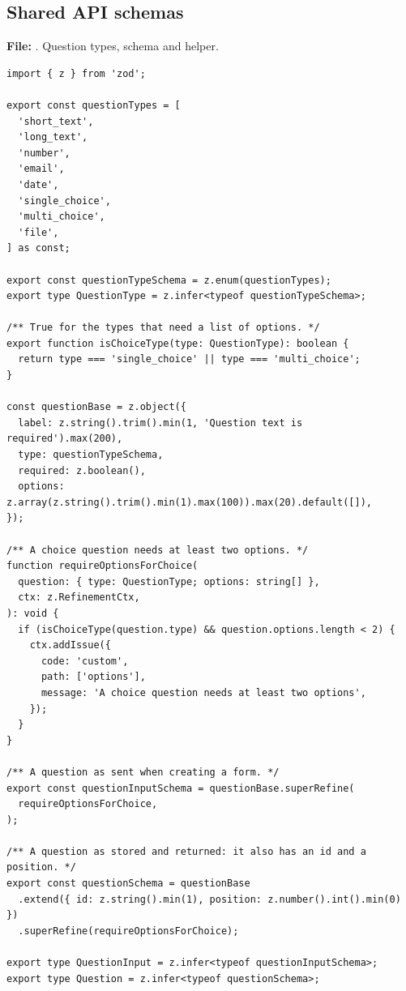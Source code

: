\documentclass[11pt,a4paper]{article}
\begin{document}
\subsection{Shared API schemas}
\textbf{File:} . Question types, schema and helper.\par
\begin{lstlisting}
import { z } from 'zod';

export const questionTypes = [
  'short_text',
  'long_text',
  'number',
  'email',
  'date',
  'single_choice',
  'multi_choice',
  'file',
] as const;

export const questionTypeSchema = z.enum(questionTypes);
export type QuestionType = z.infer<typeof questionTypeSchema>;

/** True for the types that need a list of options. */
export function isChoiceType(type: QuestionType): boolean {
  return type === 'single_choice' || type === 'multi_choice';
}

const questionBase = z.object({
  label: z.string().trim().min(1, 'Question text is required').max(200),
  type: questionTypeSchema,
  required: z.boolean(),
  options: z.array(z.string().trim().min(1).max(100)).max(20).default([]),
});

/** A choice question needs at least two options. */
function requireOptionsForChoice(
  question: { type: QuestionType; options: string[] },
  ctx: z.RefinementCtx,
): void {
  if (isChoiceType(question.type) && question.options.length < 2) {
    ctx.addIssue({
      code: 'custom',
      path: ['options'],
      message: 'A choice question needs at least two options',
    });
  }
}

/** A question as sent when creating a form. */
export const questionInputSchema = questionBase.superRefine(
  requireOptionsForChoice,
);

/** A question as stored and returned: it also has an id and a position. */
export const questionSchema = questionBase
  .extend({ id: z.string().min(1), position: z.number().int().min(0) })
  .superRefine(requireOptionsForChoice);

export type QuestionInput = z.infer<typeof questionInputSchema>;
export type Question = z.infer<typeof questionSchema>;
\end{lstlisting}
\end{document}
